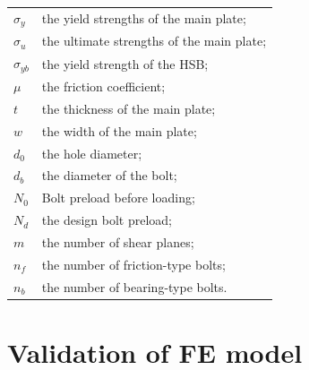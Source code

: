 \begin{tabular}{ll}
$\sigma_y$ & the yield strengths of the main plate; \\
$\sigma_u$ & the ultimate strengths of the main plate;\\
$\sigma_{yb}$ & the yield strength of the HSB; \\ 
$\mu$ & the friction coefficient;\\ 
$t$ & the thickness of the main plate; \\ 
$w$ & the width of the main plate; \\
$d_0$ & the hole diameter; \\ 
$d_b$ & the diameter of the bolt; \\ 
$N_0$ & Bolt preload before loading; \\
$N_d$ & the design bolt preload; \\
$m$ & the number of shear planes; \\ 
$n_{f}$ & the number of friction-type bolts; \\ 
$n_b$ & the number of bearing-type bolts.
\end{tabular}


\section{Validation of FE model}
\label{sec-valid}


